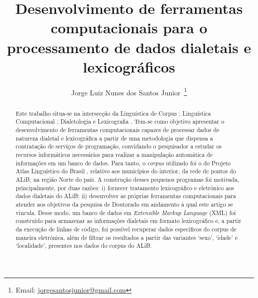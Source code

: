 \documentclass[portuguese]{textolivre}
\title{Desenvolvimento de ferramentas computacionais para o processamento de dados dialetais e lexicográficos}
\author[1]{Jorge Luiz Nunes dos Santos Junior~\orcid{0000-0002-1111-4148}\thanks{Email: \href{mailto:jorgesantosjunior@gmail.com}{jorgesantosjunior@gmail.com}}}
\affil[1]{Universidade Federal de Mato Grosso do Sul, Programa de Pós-Graduação em Letras, Três Lagoas, MS, Brasil.}
\begin{document}
\maketitle

\begin{polyabstract}
\begin{abstract}
Este trabalho situa-se na intersecção da Linguística de Corpus \cite{okeefe2010routledge}; Linguística Computacional \cite{kedia2020hands,srinivasa2018natural,manning2008introduction,manning1999foundations,chomsky1965}; Dialetologia \cite{cardoso2010,radtke1996,chambers1994} e Lexicografia \cite{tarp2008lexicography,tarp2011,tarp2015teoria,fuertes2015,leroyer2011}. Tem-se como objetivo apresentar o desenvolvimento de ferramentas computacionais capazes de processar dados de natureza dialetal e lexicográfica a partir de uma metodologia que dispensa a contratação de serviços de programação, convidando o pesquisador a estudar os recursos informáticos necessários para realizar a manipulação automática de informações em um banco de dados. Para tanto, o \textit{corpus} utilizado foi o do Projeto Atlas Linguístico do Brasil \cite{comite2001}, relativo aos municípios do interior, da rede de pontos do ALiB, na região Norte do país. A construção desses pequenos programas foi motivada, principalmente, por duas razões: i) fornecer tratamento lexicográfico e eletrônico aos dados dialetais do ALiB; ii) desenvolver as próprias ferramentas computacionais para atender aos objetivos da pesquisa de Doutorado em andamento à qual este artigo se vincula. Desse modo, um banco de dados em \textit{Extensible Markup Language} (XML) foi construído para armazenar as informações dialetais em formato lexicográfico e, a partir da execução de linhas de código, foi possível recuperar dados específicos do corpus de maneira eletrônica, além de filtrar os resultados a partir das variantes ‘sexo’, ‘idade’ e ‘localidade’, presentes nos dados do corpus do ALiB. 

\end{abstract}


\end{polyabstract}
\end{document}
